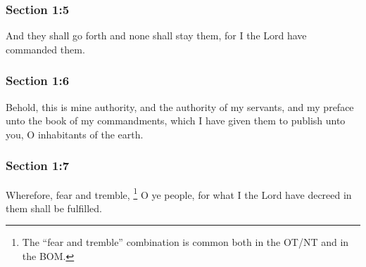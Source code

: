 	\subsubsection{Section 1:5} %
		\label{DC1-5}

		And they shall go forth and none shall stay them, for I the Lord have commanded them.


	\subsubsection{Section 1:6} %
		\label{DC1-6}

		Behold, this is mine authority, and the authority of my servants, and my preface unto the book of my commandments, which I have given them to publish unto you, O inhabitants of the earth.


	\subsubsection{Section 1:7} %
		\label{DC1-7}

		Wherefore, fear and tremble,%
			\footnote{%
				The ``fear and tremble'' combination is common both in the OT/NT and in the BOM.
				}
		O ye people, for what I the Lord have decreed in them shall be fulfilled.


